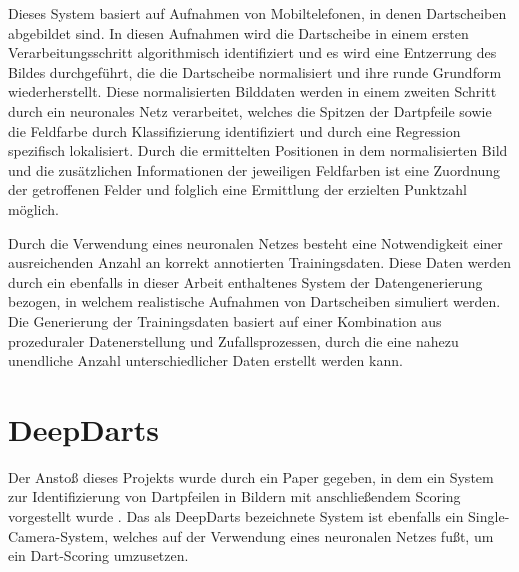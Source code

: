 Dieses System basiert auf Aufnahmen von Mobiltelefonen, in denen Dartscheiben abgebildet sind. In diesen Aufnahmen wird die Dartscheibe in einem ersten Verarbeitungsschritt algorithmisch identifiziert und es wird eine Entzerrung des Bildes durchgeführt, die die Dartscheibe normalisiert und ihre runde Grundform wiederherstellt. Diese normalisierten Bilddaten werden in einem zweiten Schritt durch ein neuronales Netz verarbeitet, welches die Spitzen der Dartpfeile sowie die Feldfarbe durch Klassifizierung identifiziert und durch eine Regression spezifisch lokalisiert. Durch die ermittelten Positionen in dem normalisierten Bild und die zusätzlichen Informationen der jeweiligen Feldfarben ist eine Zuordnung der getroffenen Felder und folglich eine Ermittlung der erzielten Punktzahl möglich.

Durch die Verwendung eines neuronalen Netzes besteht eine Notwendigkeit einer ausreichenden Anzahl an korrekt annotierten Trainingsdaten. Diese Daten werden durch ein ebenfalls in dieser Arbeit enthaltenes System der Datengenerierung bezogen, in welchem realistische Aufnahmen von Dartscheiben simuliert werden. Die Generierung der Trainingsdaten basiert auf einer Kombination aus prozeduraler Datenerstellung und Zufallsprozessen, durch die eine nahezu unendliche Anzahl unterschiedlicher Daten erstellt werden kann.




\section{DeepDarts}
\label{sec:deepdarts}

Der Anstoß dieses Projekts wurde durch ein Paper gegeben, in dem ein System zur Identifizierung von Dartpfeilen in Bildern mit anschließendem Scoring vorgestellt wurde \cite{deepdarts}. Das als DeepDarts bezeichnete System ist ebenfalls ein Single-Camera-System, welches auf der Verwendung eines neuronalen Netzes fußt, um ein Dart-Scoring umzusetzen.


